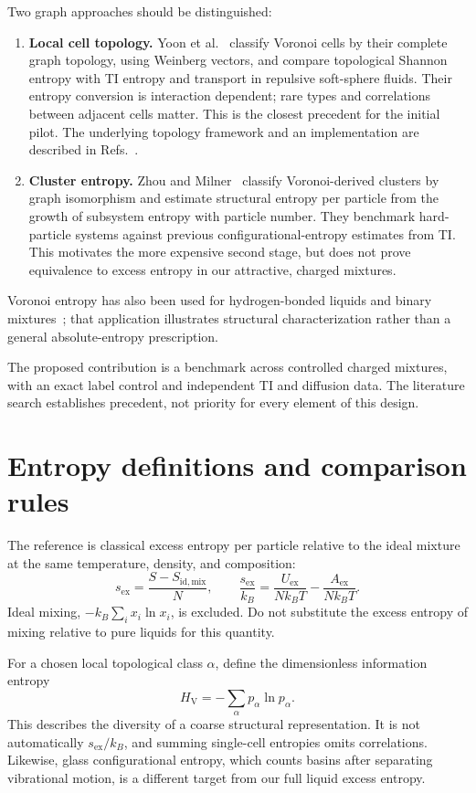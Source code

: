 \documentclass[11pt,a4paper]{article}
\newcommand{\sex}{s_{\mathrm{ex}}}
\newcommand{\Hv}{H_{\mathrm V}}
\begin{document}
Two graph approaches should be distinguished:
\begin{enumerate}
\item \textbf{Local cell topology.} Yoon et al.~\cite{Yoon2019} classify Voronoi
cells by their complete graph topology, using Weinberg vectors, and compare
topological Shannon entropy with TI entropy and transport in repulsive
soft-sphere fluids. Their entropy conversion is interaction dependent; rare
types and correlations between adjacent cells matter. This is the closest
precedent for the initial pilot. The underlying topology framework and an
implementation are described in Refs.~\cite{Lazar2015,LazarToolkit}.
\item \textbf{Cluster entropy.} Zhou and Milner~\cite{Zhou2016} classify
Voronoi-derived clusters by graph isomorphism and estimate structural entropy
per particle from the growth of subsystem entropy with particle number.
They benchmark hard-particle systems against previous configurational-entropy
estimates from TI. This motivates the more expensive second stage, but does
not prove equivalence to excess entropy in our attractive, charged mixtures.
\end{enumerate}
Voronoi entropy has also been used for hydrogen-bonded liquids and binary
mixtures~\cite{Abdulkareem2024}; that application illustrates structural
characterization rather than a general absolute-entropy prescription.

The proposed contribution is a benchmark across controlled charged mixtures,
with an exact label control and independent TI and diffusion data. The literature
search establishes precedent, not priority for every element of this design.

\section{Entropy definitions and comparison rules}
The reference is classical excess entropy per particle relative to the ideal
mixture at the same temperature, density, and composition:
\begin{equation}
\sex = \frac{S-S_{\mathrm{id,mix}}}{N},\qquad
\frac{\sex}{k_B}=\frac{U_{\mathrm{ex}}}{Nk_BT}
-\frac{A_{\mathrm{ex}}}{Nk_BT}.
\end{equation}
Ideal mixing, $-k_B\sum_i x_i\ln x_i$, is excluded. Do not substitute the
excess entropy of mixing relative to pure liquids for this quantity.

For a chosen local topological class $\alpha$, define the dimensionless
information entropy
\begin{equation}
\Hv=-\sum_\alpha p_\alpha\ln p_\alpha.
\end{equation}
This describes the diversity of a coarse structural representation. It is not
automatically $\sex/k_B$, and summing single-cell entropies omits correlations.
Likewise, glass configurational entropy, which counts basins after separating
vibrational motion, is a different target from our full liquid excess entropy.
\end{document}
